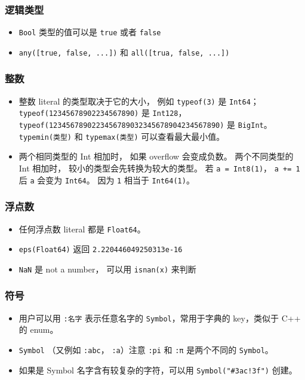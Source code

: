 \subsubsection{逻辑类型}
\begin{itemize}
\item \verb`Bool` 类型的值可以是 \verb`true` 或者 \verb`false`
\item \verb`any([true, false, ...])` 和 \verb`all([trua, false, ...])`
\end{itemize}

\subsubsection{整数}
\begin{itemize}
\item 整数 literal 的类型取决于它的大小， 例如 \verb`typeof(3)` 是 \verb`Int64`； \verb`typeof(12345678902234567890)` 是 \verb`Int128`， \verb`typeof(1234567890223456789032345678904234567890)` 是 \verb`BigInt`。 \verb`typemin(类型)` 和 \verb`typemax(类型)` 可以查看最大最小值。
\item 两个相同类型的 Int 相加时， 如果 overflow 会变成负数。 两个不同类型的 Int 相加时， 较小的类型会先转换为较大的类型。 若 \verb`a = Int8(1)`， \verb`a += 1` 后 \verb`a` 会变为 \verb`Int64`。 因为 \verb`1` 相当于 \verb`Int64(1)`。
\end{itemize}

\subsubsection{浮点数}
\begin{itemize}
\item 任何浮点数 literal 都是 \verb`Float64`。
\item \verb`eps(Float64)` 返回 \verb`2.220446049250313e-16`
\item \verb`NaN` 是 not a number， 可以用 \verb`isnan(x)` 来判断
\end{itemize}

\subsubsection{符号}
\begin{itemize}
\item 用户可以用 \verb`:名字` 表示任意名字的 \verb`Symbol`，常用于字典的 key，类似于 C++ 的 enum。
\item \verb`Symbol` （又例如 \verb`:abc`， \verb`:a`）注意 \verb`:pi` 和 \verb`:π` 是两个不同的 \verb`Symbol`。
\item 如果是 Symbol 名字含有较复杂的字符，可以用 \verb`Symbol("#3ac!3f")` 创建。
\end{itemize}



